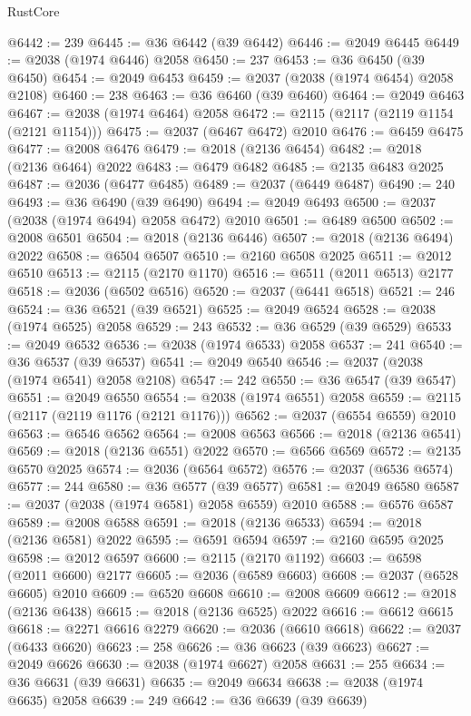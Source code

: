 \begin{lexlean}{RustCore}
\begin{coremodule}
@6442 := 239
@6445 := @36 @6442 (@39 @6442)
@6446 := @2049 @6445
@6449 := @2038 (@1974 @6446) @2058
@6450 := 237
@6453 := @36 @6450 (@39 @6450)
@6454 := @2049 @6453
@6459 := @2037 (@2038 (@1974 @6454) @2058 @2108)
@6460 := 238
@6463 := @36 @6460 (@39 @6460)
@6464 := @2049 @6463
@6467 := @2038 (@1974 @6464) @2058
@6472 := @2115 (@2117 (@2119 @1154 (@2121 @1154)))
@6475 := @2037 (@6467 @6472) @2010
@6476 := @6459 @6475
@6477 := @2008 @6476
@6479 := @2018 (@2136 @6454)
@6482 := @2018 (@2136 @6464) @2022
@6483 := @6479 @6482
@6485 := @2135 @6483 @2025
@6487 := @2036 (@6477 @6485)
@6489 := @2037 (@6449 @6487)
@6490 := 240
@6493 := @36 @6490 (@39 @6490)
@6494 := @2049 @6493
@6500 := @2037 (@2038 (@1974 @6494) @2058 @6472) @2010
@6501 := @6489 @6500
@6502 := @2008 @6501
@6504 := @2018 (@2136 @6446)
@6507 := @2018 (@2136 @6494) @2022
@6508 := @6504 @6507
@6510 := @2160 @6508 @2025
@6511 := @2012 @6510
@6513 := @2115 (@2170 @1170)
@6516 := @6511 (@2011 @6513) @2177
@6518 := @2036 (@6502 @6516)
@6520 := @2037 (@6441 @6518)
@6521 := 246
@6524 := @36 @6521 (@39 @6521)
@6525 := @2049 @6524
@6528 := @2038 (@1974 @6525) @2058
@6529 := 243
@6532 := @36 @6529 (@39 @6529)
@6533 := @2049 @6532
@6536 := @2038 (@1974 @6533) @2058
@6537 := 241
@6540 := @36 @6537 (@39 @6537)
@6541 := @2049 @6540
@6546 := @2037 (@2038 (@1974 @6541) @2058 @2108)
@6547 := 242
@6550 := @36 @6547 (@39 @6547)
@6551 := @2049 @6550
@6554 := @2038 (@1974 @6551) @2058
@6559 := @2115 (@2117 (@2119 @1176 (@2121 @1176)))
@6562 := @2037 (@6554 @6559) @2010
@6563 := @6546 @6562
@6564 := @2008 @6563
@6566 := @2018 (@2136 @6541)
@6569 := @2018 (@2136 @6551) @2022
@6570 := @6566 @6569
@6572 := @2135 @6570 @2025
@6574 := @2036 (@6564 @6572)
@6576 := @2037 (@6536 @6574)
@6577 := 244
@6580 := @36 @6577 (@39 @6577)
@6581 := @2049 @6580
@6587 := @2037 (@2038 (@1974 @6581) @2058 @6559) @2010
@6588 := @6576 @6587
@6589 := @2008 @6588
@6591 := @2018 (@2136 @6533)
@6594 := @2018 (@2136 @6581) @2022
@6595 := @6591 @6594
@6597 := @2160 @6595 @2025
@6598 := @2012 @6597
@6600 := @2115 (@2170 @1192)
@6603 := @6598 (@2011 @6600) @2177
@6605 := @2036 (@6589 @6603)
@6608 := @2037 (@6528 @6605) @2010
@6609 := @6520 @6608
@6610 := @2008 @6609
@6612 := @2018 (@2136 @6438)
@6615 := @2018 (@2136 @6525) @2022
@6616 := @6612 @6615
@6618 := @2271 @6616 @2279
@6620 := @2036 (@6610 @6618)
@6622 := @2037 (@6433 @6620)
@6623 := 258
@6626 := @36 @6623 (@39 @6623)
@6627 := @2049 @6626
@6630 := @2038 (@1974 @6627) @2058
@6631 := 255
@6634 := @36 @6631 (@39 @6631)
@6635 := @2049 @6634
@6638 := @2038 (@1974 @6635) @2058
@6639 := 249
@6642 := @36 @6639 (@39 @6639)

\end{coremodule}
\end{lexlean}
